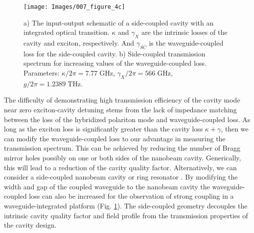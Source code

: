 \documentclass{achemso}
\begin{document}
\begin{figure}
	\centering
	\texttt{[image: Images/007\_figure\_4c]}
	\caption{a) The input-output schematic of a side-coupled cavity with an integrated optical transition. $\kappa$ and $\gamma_{X}$ are the intrinsic losses of the cavity and exciton, respectively. And $\gamma_{SC}$ is the waveguide-coupled loss for the side-coupled cavity. b) Side-coupled transmission spectrum for increasing values of the waveguide-coupled loss. Parameters: $\kappa/2\pi = 7.77 \; \si{\giga \hertz}$, $\gamma_{X}/2\pi = 566 \; \si{\giga \hertz}$, $g / 2\pi = 1.2389 \; \si{\tera \hertz}$.}
	\label{fig:003figure5}
\end{figure}

The difficulty of demonstrating high transmission efficiency of the cavity mode near zero exciton-cavity detuning stems from the lack of impedance matching between the loss of the hybridized polariton mode and waveguide-coupled loss. As long as the exciton loss is significantly greater than the cavity loss $\kappa + \gamma$, then we can modify the waveguide-coupled loss to our advantage in measuring the transmission spectrum. This can be achieved by reducing the number of Bragg mirror holes possibly on one or both sides of the nanobeam cavity. Generically, this will lead to a reduction of the cavity quality factor. Alternatively, we can consider a side-coupled nanobeam cavity \cite{afzal_efficient_2019} or ring resonator \cite{rosser_high-precision_2020}. By modifying the width and gap of the coupled waveguide to the nanobeam cavity the waveguide-coupled loss can also be increased for the observation of strong coupling in a waveguide-integrated platform (Fig. \ref{fig:003figure5}). The side-coupled geometry decouples the intrinsic cavity quality factor and field profile from the transmission properties of the cavity design.
\end{document}
